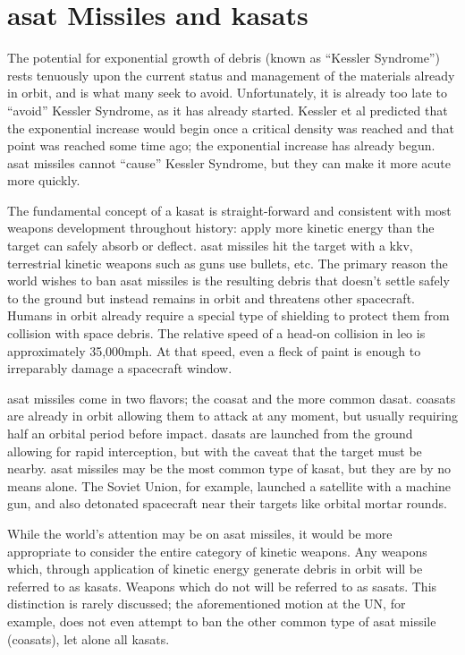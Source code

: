 \section*{\ac{asat} Missiles and \acfp{kasat}}

The potential for exponential growth of debris (known as ``Kessler
Syndrome'') rests tenuously upon the current status and management of
the materials already in orbit, and is what many seek to avoid.
Unfortunately, it is already too late to ``avoid'' Kessler Syndrome,
as it has already started.  Kessler et al predicted that the
exponential increase would begin once a critical density was reached
and that point was reached some time ago; the exponential increase has
already begun.\cite[p14]{kessler-reunion} \ac{asat} missiles cannot
``cause'' Kessler Syndrome, but they can make it more acute more
quickly.\cite[p10]{kessler-reunion}

The fundamental concept of a \ac{kasat} is straight-forward and
consistent with most weapons development throughout history: apply
more kinetic energy than the target can safely absorb or deflect.
\ac{asat} missiles hit the target with a \ac{kkv}, terrestrial kinetic
weapons such as guns use bullets, etc.  The primary reason the world
wishes to ban \ac{asat} missiles is the resulting debris that doesn't
settle safely to the ground but instead remains in orbit and threatens
other spacecraft.  Humans in orbit already require a special type of
shielding to protect them from collision with space
debris.\cite{whipple-me-spacecraft} The relative speed of a head-on
collision in \ac{leo} is approximately 35,000mph.  At that speed, even
a fleck of paint is enough to irreparably damage a spacecraft
window.\cite{iss-throwing-stones}

\ac{asat} missiles come in two flavors; the \acf{coasat} and the more
common \acf{dasat}.\cite{brian} \acp{coasat} are already in orbit
allowing them to attack at any moment, but usually requiring half an
orbital period before impact.\cite{brian} \acp{dasat} are launched
from the ground allowing for rapid interception, but with the caveat
that the target must be nearby.\cite{grego} \ac{asat} missiles may be
the most common type of \ac{kasat}, but they are by no means alone.
The Soviet Union, for example, launched a satellite with a machine
gun, and also detonated spacecraft near their targets like orbital
mortar rounds.\cite{brian}

While the world's attention may be on \ac{asat} missiles, it would be
more appropriate to consider the entire category of kinetic weapons.
Any weapons which, through application of kinetic energy generate
debris in orbit will be referred to as \acp{kasat}.  Weapons which do
not will be referred to as \acp{sasat}.  This distinction is rarely
discussed; the aforementioned motion at the UN, for example, does not
even attempt to ban the other common type of \ac{asat} missile
(\acp{coasat}), let alone all \acp{kasat}.\cite{un-asat-me-not}

